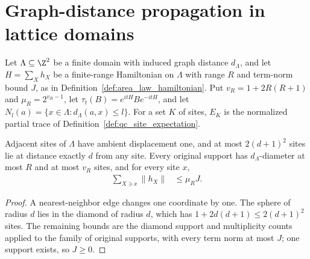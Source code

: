
\section{Graph-distance propagation in lattice domains}

Let $\Lambda\subseteq\Z^2$ be a finite domain with induced graph distance
$d_\Lambda$, and let $H=\sum_Xh_X$ be a finite-range Hamiltonian on $\Lambda$
with range $R$ and term-norm bound $J$, as in
Definition~\ref{def:area_law_hamiltonian}. Put $v_R=1+2R(R+1)$ and
$\mu_R=2^{v_R-1}$, let $\tau_t(B)=e^{itH}Be^{-itH}$, and let
$N_l(a)=\{x\in\Lambda:d_\Lambda(a,x)\le l\}$. For a set $K$ of sites, $E_K$ is
the normalized partial trace of Definition~\ref{def:qc_site_expectation}.

\begin{lemma}
    \label{lem:area_domain_graph_counts}
    \leanok
    Adjacent sites of $\Lambda$ have ambient displacement one, and at most
    $2(d+1)^2$ sites lie at distance exactly $d$ from any site. Every
    original support has $d_\Lambda$-diameter at most $R$ and at most $v_R$
    sites, and for every site $x$,
    \begin{align}
        \sum_{X\ni x}\|h_X\| & \le\mu_RJ.
        \label{eq:area_domain_site_budget}
    \end{align}
\end{lemma}
\begin{proof}
    \leanok
    A nearest-neighbor edge changes one coordinate by one. The sphere of
    radius $d$ lies in the diamond of radius $d$, which has
    $1+2d(d+1)\le2(d+1)^2$ sites. The remaining bounds are the diamond
    support and multiplicity counts applied to the family of original
    supports, with every term norm at most $J$; one support exists, so
    $J\ge0$.
\end{proof}

